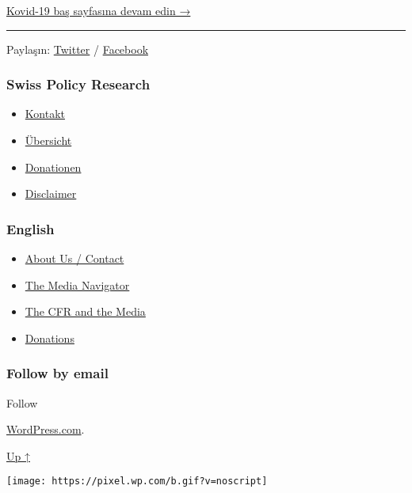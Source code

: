 \href{https://swprs.org/isvicreli-bir-doktordan-kovid-19-uezerine/}{Kovid-19
baş sayfasına devam edin →}

\begin{center}\rule{0.5\linewidth}{\linethickness}\end{center}

Paylaşın:
\href{https://twitter.com/intent/tweet?url=https://swprs.org/korona-medya-ve-propaganda-uezerine/}{Twitter}
/
\href{https://www.facebook.com/share.php?u=https://swprs.org/korona-medya-ve-propaganda-uezerine/}{Facebook}

\hypertarget{swiss-policy-research}{%
\subsubsection{Swiss Policy Research}\label{swiss-policy-research}}

\begin{itemize}
\tightlist
\item
  \href{https://swprs.org/kontakt/}{Kontakt}
\item
  \href{https://swprs.org/uebersicht/}{Übersicht}
\item
  \href{https://swprs.org/donationen/}{Donationen}
\item
  \href{https://swprs.org/disclaimer/}{Disclaimer}
\end{itemize}

\hypertarget{english}{%
\subsubsection{English}\label{english}}

\begin{itemize}
\tightlist
\item
  \href{https://swprs.org/contact/}{About Us / Contact}
\item
  \href{https://swprs.org/media-navigator/}{The Media Navigator}
\item
  \href{https://swprs.org/the-american-empire-and-its-media/}{The CFR
  and the Media}
\item
  \href{https://swprs.org/donations/}{Donations}
\end{itemize}

\hypertarget{follow-by-email}{%
\subsubsection{Follow by email}\label{follow-by-email}}

Follow

\href{https://wordpress.com/?ref=footer_custom_com}{WordPress.com}.

\protect\hyperlink{}{Up ↑}

\texttt{[image: https://pixel.wp.com/b.gif?v=noscript]}
